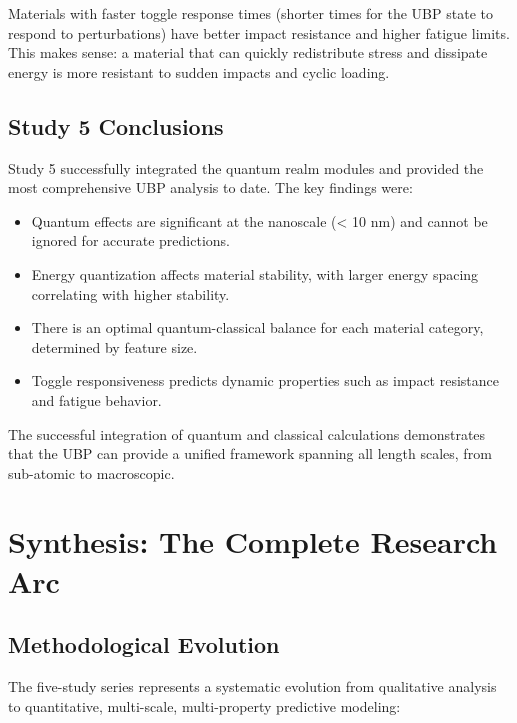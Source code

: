 \documentclass[11pt,a4paper]{article}
\begin{document}
Materials with faster toggle response times (shorter times for the UBP state to respond to perturbations) have better impact resistance and higher fatigue limits. This makes sense: a material that can quickly redistribute stress and dissipate energy is more resistant to sudden impacts and cyclic loading.

\subsection{Study 5 Conclusions}

Study 5 successfully integrated the quantum realm modules and provided the most comprehensive UBP analysis to date. The key findings were:

\begin{itemize}
    \item Quantum effects are significant at the nanoscale (< 10 nm) and cannot be ignored for accurate predictions.
    \item Energy quantization affects material stability, with larger energy spacing correlating with higher stability.
    \item There is an optimal quantum-classical balance for each material category, determined by feature size.
    \item Toggle responsiveness predicts dynamic properties such as impact resistance and fatigue behavior.
\end{itemize}

The successful integration of quantum and classical calculations demonstrates that the UBP can provide a unified framework spanning all length scales, from sub-atomic to macroscopic.

\section{Synthesis: The Complete Research Arc}

\subsection{Methodological Evolution}

The five-study series represents a systematic evolution from qualitative analysis to quantitative, multi-scale, multi-property predictive modeling:
\end{document}
